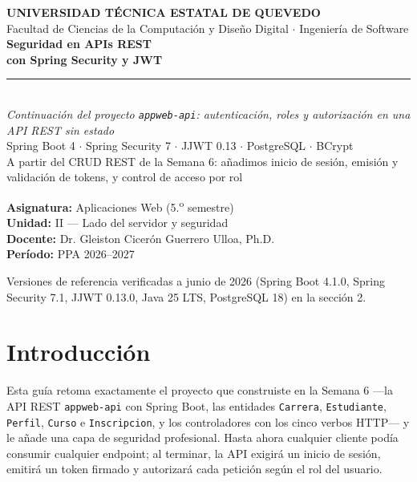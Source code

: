 \documentclass[11pt]{article}
\begin{document}
\begin{titlepage}
\vspace*{1.1cm}
{\color{jwebazul}\bfseries\large UNIVERSIDAD T\'ECNICA ESTATAL DE QUEVEDO}\\[2pt]
{\color{gray} Facultad de Ciencias de la Computaci\'on y Dise\~no Digital $\cdot$ Ingenier\'ia de Software}\\[2cm]
{\color{tinta}\bfseries\fontsize{30}{34}\selectfont Seguridad en APIs REST}\\[6pt]
{\color{jwebazul}\bfseries\fontsize{30}{34}\selectfont con Spring Security y JWT}\\[10pt]
{\color{jweboro}\rule{\linewidth}{2.2pt}}\\[10pt]
{\itshape\large Continuaci\'on del proyecto \texttt{appweb-api}: autenticaci\'on, roles y autorizaci\'on en una API REST sin estado}\\[4pt]
{\color{gray} Spring Boot 4 $\cdot$ Spring Security 7 $\cdot$ JJWT 0.13 $\cdot$ PostgreSQL $\cdot$ BCrypt}\\[2.4cm]
{\color{jwebazulo} A partir del CRUD REST de la Semana 6: a\~nadimos inicio de sesi\'on, emisi\'on y validaci\'on de tokens, y control de acceso por rol}\\[2cm]
\begin{flushleft}
\textbf{Asignatura:} Aplicaciones Web (5.\textsuperscript{o} semestre)\\[3pt]
\textbf{Unidad:} II --- Lado del servidor y seguridad\\[3pt]
\textbf{Docente:} Dr. Gleiston Cicer\'on Guerrero Ulloa, Ph.D.\\[3pt]
\textbf{Per\'iodo:} PPA 2026--2027
\end{flushleft}
\vfill
{\color{gray}\small Versiones de referencia verificadas a junio de 2026 (Spring Boot 4.1.0, Spring Security 7.1, JJWT 0.13.0, Java 25 LTS, PostgreSQL 18) en la secci\'on 2.}
\end{titlepage}
\tableofcontents
\clearpage

\section{Introducción}
Esta guía retoma exactamente el proyecto que construiste en la Semana 6 ---la API REST \texttt{appweb-api} con Spring Boot, las entidades \texttt{Carrera}, \texttt{Estudiante}, \texttt{Perfil}, \texttt{Curso} e \texttt{Inscripcion}, y los controladores con los cinco verbos HTTP--- y le añade una capa de seguridad profesional. Hasta ahora cualquier cliente podía consumir cualquier endpoint; al terminar, la API exigirá un inicio de sesión, emitirá un token firmado y autorizará cada petición según el rol del usuario.
\end{document}
